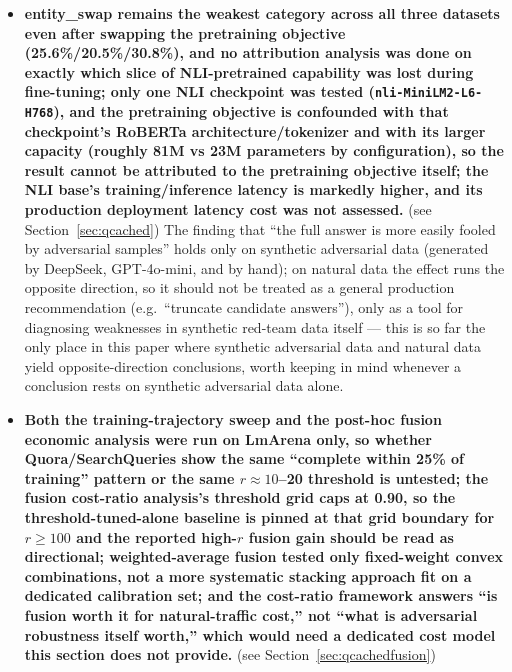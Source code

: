 \documentclass[11pt]{article}
\begin{document}
\begin{itemize}[leftmargin=*]
  \item \textbf{entity\_swap remains the weakest category across all three datasets even after swapping the pretraining objective (25.6\%/20.5\%/30.8\%), and no attribution analysis was done on exactly which slice of NLI-pretrained capability was lost during fine-tuning; only one NLI checkpoint was tested (\texttt{nli-Mini\allowbreak{}LM2-L6-H768}), and the pretraining objective is confounded with that checkpoint's RoBERTa architecture/tokenizer and with its larger capacity (roughly 81M vs 23M parameters by configuration), so the result cannot be attributed to the pretraining objective itself; the NLI base's training/inference latency is markedly higher, and its production deployment latency cost was not assessed.} (see Section~\ref{sec:qcached}) The finding that ``the full answer is more easily fooled by adversarial samples'' holds only on synthetic adversarial data (generated by DeepSeek, GPT-4o-mini, and by hand); on natural data the effect runs the opposite direction, so it should not be treated as a general production recommendation (e.g.\ ``truncate candidate answers''), only as a tool for diagnosing weaknesses in synthetic red-team data itself --- this is so far the only place in this paper where synthetic adversarial data and natural data yield opposite-direction conclusions, worth keeping in mind whenever a conclusion rests on synthetic adversarial data alone.
  \item \textbf{Both the training-trajectory sweep and the post-hoc fusion economic analysis were run on LmArena only, so whether Quora/SearchQueries show the same ``complete within 25\% of training'' pattern or the same $r \approx 10$--20 threshold is untested; the fusion cost-ratio analysis's threshold grid caps at 0.90, so the threshold-tuned-alone baseline is pinned at that grid boundary for $r \ge 100$ and the reported high-$r$ fusion gain should be read as directional; weighted-average fusion tested only fixed-weight convex combinations, not a more systematic stacking approach fit on a dedicated calibration set; and the cost-ratio framework answers ``is fusion worth it for natural-traffic cost,'' not ``what is adversarial robustness itself worth,'' which would need a dedicated cost model this section does not provide.} (see Section~\ref{sec:qcachedfusion})

\end{itemize}
\end{document}
